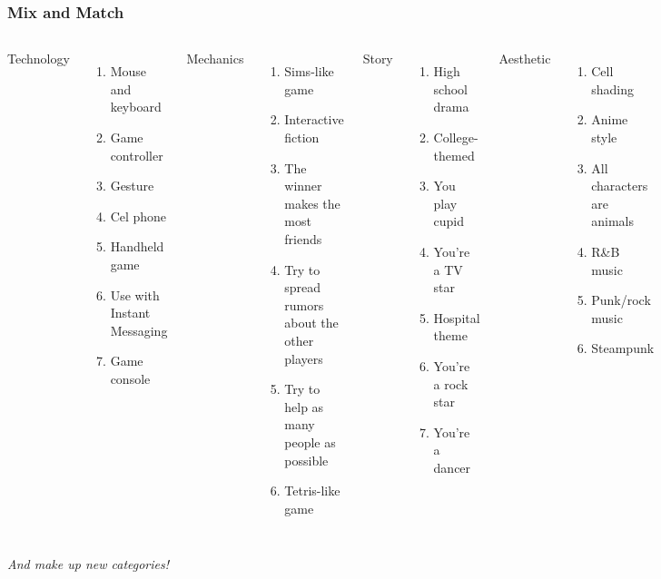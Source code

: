 \documentclass{beamer}
\begin{document}
\begin{frame}
  \frametitle{Mix and Match}

\begin{columns}[t]
Technology
\begin{enumerate}\scriptsize
\item Mouse and keyboard
\item Game controller
\item Gesture
\item Cel phone
\item Handheld game
\item Use with Instant Messaging
\item Game console
\end{enumerate}
Mechanics
\begin{enumerate}\scriptsize
\item Sims-like game
\item Interactive fiction
\item The winner makes the most friends
\item Try to spread rumors about the other players
\item Try to help as many people as possible
\item Tetris-like game
\end{enumerate}
Story
\begin{enumerate}\scriptsize
\item High school drama
\item College-themed
\item You play cupid
\item You're a TV star
\item Hospital theme
\item You're a rock star
\item You're a dancer
\end{enumerate}
Aesthetic
\begin{enumerate}\scriptsize
\item Cell shading
\item Anime style
\item All characters are animals
\item R\&B music
\item Punk/rock music
\item Steampunk
\end{enumerate}
\end{columns}
\pause
\hfill {\em And make up new categories!}

\end{frame}
\end{document}
